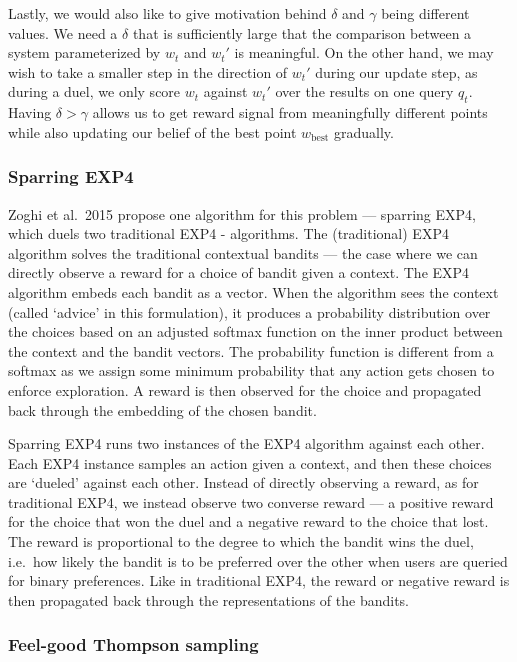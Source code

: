 \documentclass[
  letterpaper,
  DIV=11,
  numbers=noendperiod,
  oneside]{scrreprt}
\theoremstyle{remark}
\begin{document}
Lastly, we would also like to give motivation behind \(\delta\) and
\(\gamma\) being different values. We need a \(\delta\) that is
sufficiently large that the comparison between a system parameterized by
\(w_t\) and \(w_t'\) is meaningful. On the other hand, we may wish to
take a smaller step in the direction of \(w_t'\) during our update step,
as during a duel, we only score \(w_t\) against \(w_t'\) over the
results on one query \(q_t\). Having \(\delta > \gamma\) allows us to
get reward signal from meaningfully different points while also updating
our belief of the best point \(w_{\text{best}}\) gradually.

\subsubsection*{Sparring EXP4}\label{sparring-exp4}

Zoghi et al.~2015 propose one algorithm for this problem --- sparring
EXP4, which duels two traditional EXP4 - algorithms. The (traditional)
EXP4 algorithm solves the traditional contextual bandits --- the case
where we can directly observe a reward for a choice of bandit given a
context. The EXP4 algorithm embeds each bandit as a vector. When the
algorithm sees the context (called `advice' in this formulation), it
produces a probability distribution over the choices based on an
adjusted softmax function on the inner product between the context and
the bandit vectors. The probability function is different from a softmax
as we assign some minimum probability that any action gets chosen to
enforce exploration. A reward is then observed for the choice and
propagated back through the embedding of the chosen bandit.

Sparring EXP4 runs two instances of the EXP4 algorithm against each
other. Each EXP4 instance samples an action given a context, and then
these choices are `dueled' against each other. Instead of directly
observing a reward, as for traditional EXP4, we instead observe two
converse reward --- a positive reward for the choice that won the duel
and a negative reward to the choice that lost. The reward is
proportional to the degree to which the bandit wins the duel, i.e.~how
likely the bandit is to be preferred over the other when users are
queried for binary preferences. Like in traditional EXP4, the reward or
negative reward is then propagated back through the representations of
the bandits.

\subsubsection{Feel-good Thompson
sampling}\label{feel-good-thompson-sampling}
\end{document}
